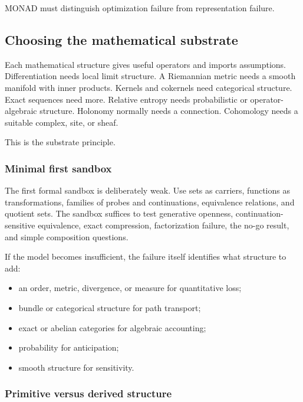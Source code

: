 
MONAD must distinguish optimization failure from representation
failure.

\subsection{Choosing the mathematical substrate}

Each mathematical structure gives useful operators and imports
assumptions. Differentiation needs local limit structure. A Riemannian
metric needs a smooth manifold with inner products. Kernels and
cokernels need categorical structure. Exact sequences need more.
Relative entropy needs probabilistic or operator-algebraic structure.
Holonomy normally needs a connection. Cohomology needs a suitable
complex, site, or sheaf.


This is the substrate principle.

\subsubsection{Minimal first sandbox}\label{ss:sandbox}

The first formal sandbox is deliberately weak. Use sets as carriers,
functions as transformations, families of probes and continuations,
equivalence relations, and quotient sets. The sandbox suffices to test
generative openness, continuation-sensitive equivalence, exact
compression, factorization failure, the no-go result, and simple
composition questions.

If the model becomes insufficient, the failure itself identifies what
structure to add:
\begin{itemize}
  \item an order, metric, divergence, or measure for quantitative loss;
  \item bundle or categorical structure for path transport;
  \item exact or abelian categories for algebraic accounting;
  \item probability for anticipation;
  \item smooth structure for sensitivity.
\end{itemize}

\subsubsection{Primitive versus derived structure}

